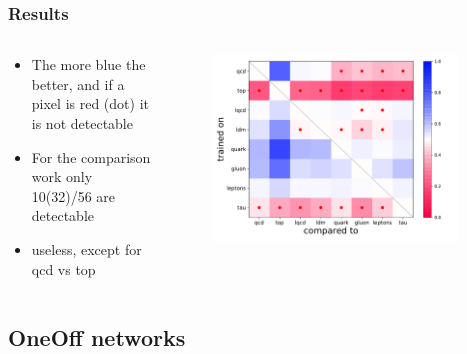 \documentclass[hyperref={pdfpagelabels=false}]{beamer}
\begin{document}
\begin{frame}[label=data_0]
\frametitle{Results}
\begin{columns}[c] %
\begin{column}{0.3\textwidth}%
\begin{itemize}

    \item The more blue the better, and if a pixel is red (dot) it is not detectable

    \item For the comparison work only 10(32)/56 are detectable

    \item useless, except for qcd vs top


\end{itemize}
\end{column}%
\hfill%
\begin{column}{0.68\textwidth}%
\begin{figure}[H] 
  \centering
\includegraphics[width=0.95\textwidth]{../imgs/crossroc}
\label{fig:crossroc}
  \end{figure}


\end{column}%
\hfill%
\end{columns}

\end{frame}





\subsection{OneOff networks }\label{sec:OneOff networks}
\end{document}
